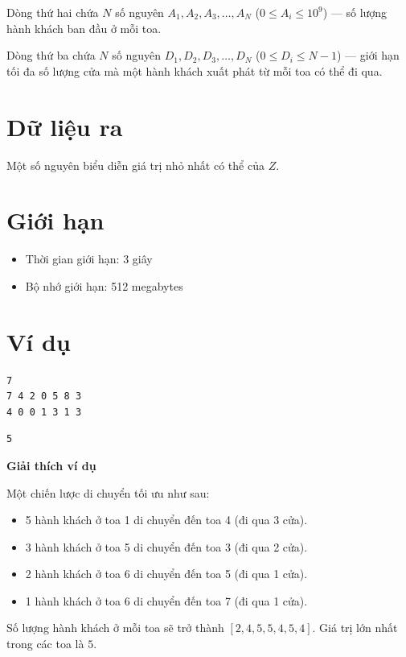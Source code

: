 \documentclass[12pt,a4paper]{article}
\newcommand{\explanation}{%
  \vspace{6pt}\textbf{\textcolor{sectioncolor}{Giải thích ví dụ}}\par\vspace{2pt}%
}
\begin{document}
Dòng thứ hai chứa $N$ số nguyên $A_1, A_2, A_3, \ldots, A_N$ ($0 \leq A_i \leq 10^9$) — số lượng hành khách ban đầu ở mỗi toa.

Dòng thứ ba chứa $N$ số nguyên $D_1, D_2, D_3, \ldots, D_N$ ($0 \leq D_i \leq N-1$) — giới hạn tối đa số lượng cửa mà một hành khách xuất phát từ mỗi toa có thể đi qua.

\section*{Dữ liệu ra}
Một số nguyên biểu diễn giá trị nhỏ nhất có thể của $Z$.

\section*{Giới hạn}
\begin{constraintbox}
\begin{itemize}[leftmargin=1.5em]
    \item Thời gian giới hạn: 3 giây
    \item Bộ nhớ giới hạn: 512 megabytes
\end{itemize}
\end{constraintbox}

\section*{Ví dụ}
\begin{inputbox}
\begin{lstlisting}
7
7 4 2 0 5 8 3
4 0 0 1 3 1 3
\end{lstlisting}
\end{inputbox}

\begin{outputbox}
\begin{lstlisting}
5
\end{lstlisting}
\end{outputbox}

\explanation
Một chiến lược di chuyển tối ưu như sau:
\begin{itemize}[leftmargin=1.5em]
    \item 5 hành khách ở toa 1 di chuyển đến toa 4 (đi qua 3 cửa).
    \item 3 hành khách ở toa 5 di chuyển đến toa 3 (đi qua 2 cửa).
    \item 2 hành khách ở toa 6 di chuyển đến toa 5 (đi qua 1 cửa).
    \item 1 hành khách ở toa 6 di chuyển đến toa 7 (đi qua 1 cửa).
\end{itemize}
Số lượng hành khách ở mỗi toa sẽ trở thành $[2, 4, 5, 5, 4, 5, 4]$. Giá trị lớn nhất trong các toa là $5$.
\end{document}
